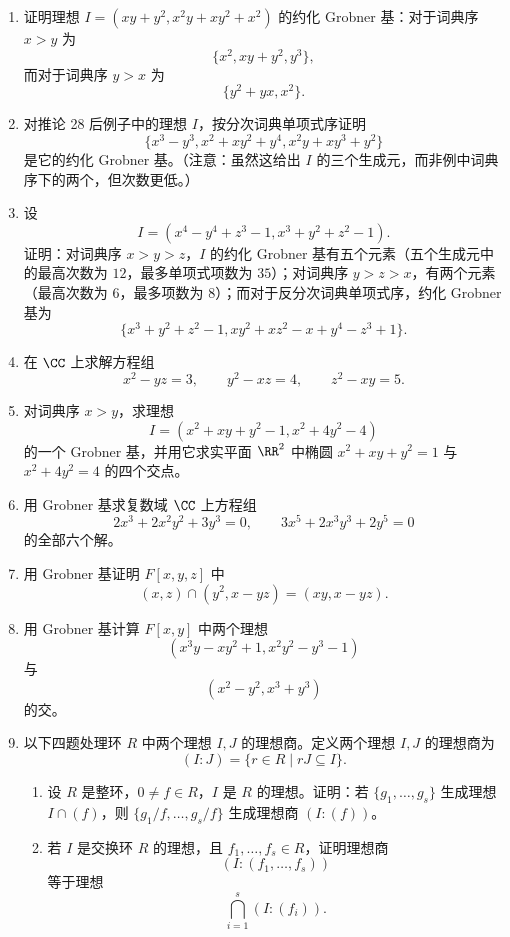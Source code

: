 \begin{enumerate}[label=\arabic*.]
	\item 证明理想 $I=(xy+y^2,x^2y+xy^2+x^2)$ 的约化 Grobner 基：对于词典序 $x>y$ 为
	\[
	\{x^2,xy+y^2,y^3\},
	\]
	而对于词典序 $y>x$ 为
	\[
	\{y^2+yx,x^2\}.
	\]
	
	\item 对推论 28 后例子中的理想 $I$，按分次词典单项式序证明
	\[
	\{x^3-y^3,
	x^2+xy^2+y^4,
	x^2y+xy^3+y^2\}
	\]
	是它的约化 Grobner 基。（注意：虽然这给出 $I$ 的三个生成元，而非例中词典序下的两个，但次数更低。）
	
	\item 设
	\[
	I=(x^4-y^4+z^3-1,
	x^3+y^2+z^2-1).
	\]
	证明：对词典序 $x>y>z$，$I$ 的约化 Grobner 基有五个元素（五个生成元中的最高次数为 $12$，最多单项式项数为 $35$）；对词典序 $y>z>x$，有两个元素（最高次数为 $6$，最多项数为 $8$）；而对于反分次词典单项式序，约化 Grobner 基为
	\[
	\{x^3+y^2+z^2-1,
	xy^2+xz^2-x+y^4-z^3+1\}.
	\]
	
	\item 在 $\CC$ 上求解方程组
	\[
	x^2-yz=3,
	\qquad y^2-xz=4,
	\qquad z^2-xy=5.
	\]
	
	\item 对词典序 $x>y$，求理想
	\[
	I=(x^2+xy+y^2-1,
	x^2+4y^2-4)
	\]
	的一个 Grobner 基，并用它求实平面 $\RR^2$ 中椭圆 $x^2+xy+y^2=1$ 与 $x^2+4y^2=4$ 的四个交点。
	
	\item 用 Grobner 基求复数域 $\CC$ 上方程组
	\[
	2x^3+2x^2y^2+3y^3=0,
	\qquad
	3x^5+2x^3y^3+2y^5=0
	\]
	的全部六个解。
	
	\item 用 Grobner 基证明 $F[x,y,z]$ 中
	\[
	(x,z)\cap(y^2,x-yz)=(xy,x-yz).
	\]
	
	\item 用 Grobner 基计算 $F[x,y]$ 中两个理想
	\[
	(x^3y-xy^2+1,
	x^2y^2-y^3-1)
	\]
	与
	\[
	(x^2-y^2,
	x^3+y^3)
	\]
	的交。
	
	\item 以下四题处理环 $R$ 中两个理想 $I,J$ 的理想商。定义两个理想 $I,J$ 的理想商为
	\[
	(I:J)=\{r\in R\mid rJ\subseteq I\}.
	\]
	\begin{enumerate}[label=(\alph*)]
		\item 设 $R$ 是整环，$0\neq f\in R$，$I$ 是 $R$ 的理想。证明：若 $\{g_1,
		\ldots,g_s\}$ 生成理想 $I\cap(f)$，则 $\{g_1/f,
		\ldots,g_s/f\}$ 生成理想商 $(I:(f))$。
		\item 若 $I$ 是交换环 $R$ 的理想，且 $f_1,
		\ldots,f_s\in R$，证明理想商
		\[
		(I:(f_1,
		\ldots,f_s))
		\]
		等于理想
		\[
		\bigcap_{i=1}^s (I:(f_i)).
		\]
	\end{enumerate}
	

\end{enumerate}
